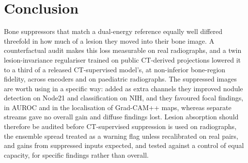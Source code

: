 \section{Conclusion}
\label{sec:conclusion}
Bone suppressors that match a dual-energy reference equally well differed threefold in how much of a lesion they moved into their bone
image. A counterfactual audit makes this loss measurable on real radiographs, and a twin lesion-invariance regulariser trained on public
CT-derived projections lowered it to a third of a released CT-supervised model's, at non-inferior bone-region fidelity, across encoders
and on paediatric radiographs. The suppressed images are worth using in a specific way: added as extra channels they improved nodule
detection on Node21 and classification on NIH, and they favoured focal findings, in AUROC and in the localisation of Grad-CAM++ maps,
whereas separate streams gave no overall gain and diffuse findings lost. Lesion absorption should therefore be audited before
CT-supervised suppression is used on radiographs, the ensemble spread treated as a warning flag unless recalibrated on real pairs, and
gains from suppressed inputs expected, and tested against a control of equal capacity, for specific findings rather than overall.
